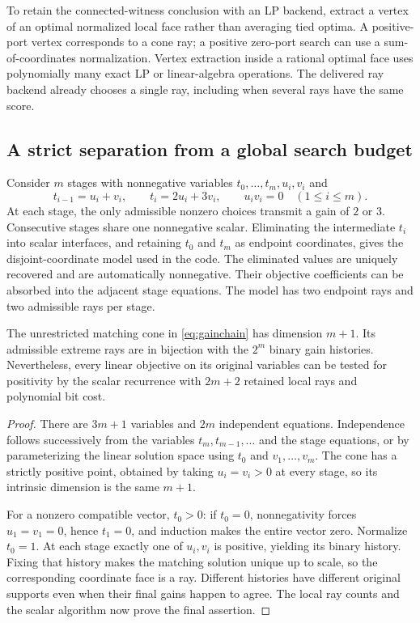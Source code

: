 To retain the connected-witness conclusion with an LP backend, extract a vertex
of an optimal normalized local face rather than averaging tied optima. A
positive-port vertex corresponds to a cone ray; a positive zero-port search
can use a sum-of-coordinates normalization. Vertex extraction inside a rational
optimal face uses polynomially many exact LP or linear-algebra operations.
The delivered ray backend already chooses a single ray, including when several
rays have the same score.

\subsection{A strict separation from a global search budget}

Consider $m$ stages with nonnegative variables $t_0,\ldots,t_m,u_i,v_i$ and
\begin{equation}\label{eq:gainchain}
 t_{i-1}=u_i+v_i,\qquad t_i=2u_i+3v_i,\qquad u_iv_i=0
 \quad(1\leq i\leq m).
\end{equation}
At each stage, the only admissible nonzero choices transmit a gain of $2$ or
$3$. Consecutive stages share one nonnegative scalar. Eliminating the intermediate $t_i$ into scalar interfaces, and retaining $t_0$
and $t_m$ as endpoint coordinates, gives the disjoint-coordinate model used in
the code. The eliminated values are uniquely recovered and are automatically
nonnegative. Their objective coefficients can be absorbed into the adjacent
stage equations. The model has two endpoint rays and two admissible rays per
stage.

\begin{proposition}
The unrestricted matching cone in \eqref{eq:gainchain} has dimension $m+1$.
Its admissible extreme rays are in bijection with the $2^m$ binary gain
histories. Nevertheless, every linear objective on its original variables can
be tested for positivity by the scalar recurrence with $2m+2$ retained local
rays and polynomial bit cost.
\end{proposition}

\begin{proof}
There are $3m+1$ variables and $2m$ independent equations. Independence follows
successively from the variables $t_m,t_{m-1},\ldots$ and the stage equations,
or by parameterizing the linear solution space using $t_0$ and $v_1,\ldots,v_m$.
The cone has a strictly positive point, obtained by taking $u_i=v_i>0$ at every
stage, so its intrinsic dimension is the same $m+1$.

For a nonzero compatible vector, $t_0>0$: if $t_0=0$, nonnegativity forces
$u_1=v_1=0$, hence $t_1=0$, and induction makes the entire vector zero. Normalize
$t_0=1$. At each stage exactly one of $u_i,v_i$ is positive, yielding its binary
history. Fixing that history makes the matching solution unique up to scale,
so the corresponding coordinate face is a ray. Different histories have
different original supports even when their final gains happen to agree.
The local ray counts and the scalar algorithm now prove the final assertion.
\end{proof}

